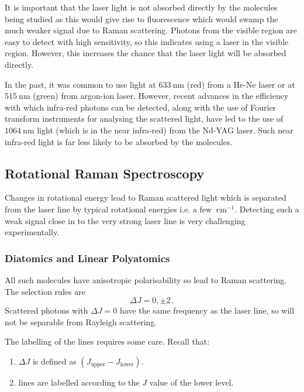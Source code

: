 \documentclass{article}
\theoremstyle{plain}\theoremheaderfont{\normalfont\itshape}\theorembodyfont{\rmfamily}\theoremseparator{.}\newtheorem*{rem}{Remark}\newtheorem*{ex}{Example}\newtheorem*{proof}{Proof}\newtheorem*{altp}{Alternative proof}
\theoremstyle{plain}\theoremheaderfont{\normalfont\bfseries}\theorembodyfont{\rmfamily}\theoremseparator{.}\newtheorem{thm}{Theorem}[section]\newtheorem{lem}[thm]{Lemma}\newtheorem{prop}[thm]{Proposition}\newtheorem*{cor}{Corollary}\newtheorem{defn}[thm]{Definition}\newtheorem{clm}[thm]{Claim}\newtheorem{clminproof}{Claim}\newtheorem{pos}{Postulate}[section]
\theoremstyle{break}\theoremheaderfont{\normalfont\itshape}\theorembodyfont{\rmfamily}\theoremseparator{.\medskip}\newtheorem*{proofskip}{Proof}\newtheorem*{exs}{Examples}\newtheorem*{rems}{Remarks}
\theoremstyle{break}\theoremheaderfont{\normalfont\bfseries}\theorembodyfont{\rmfamily}\theoremseparator{.\medskip}\newtheorem{lemskip}[thm]{Lemma}\newtheorem{defnskip}[thm]{Definition}\newtheorem{propskip}[thm]{Proposition}\newtheorem{thmskip}[thm]{Theorem}
\numberwithin{equation}{section}
\newcommand{\unit}[1]{\ \mathrm{#1}}
\begin{document}
    It is important that the laser light is not absorbed directly by the molecules being studied as this would give rise to fluorescence which would swamp the much weaker signal due to Raman scattering. Photons from the visible region are easy to detect with high sensitivity, so this indicates using a laser in the visible region. However, this increases the chance that the laser light will be absorbed directly.
    
    In the past, it was common to use light at \(633\unit{nm}\) (red) from a He-Ne laser or at \(515\unit{nm}\) (green) from argon-ion laser. However, recent advances in the efficiency with which infra-red photons can be detected, along with the use of Fourier transform instruments for analysing the scattered light, have led to the use of \(1064\unit{nm}\) light (which is in the near infra-red) from the Nd-YAG laser. Such near infra-red light is far less likely to be absorbed by the molecules.

    \subsection{Rotational Raman Spectroscopy}
    Changes in rotational energy lead to Raman scattered light which is separated from the laser line by typical rotational energies i.e. a few \(\!\unit{cm}^{-1}\). Detecting such a weak signal close in to the very strong laser line is very challenging experimentally.

    \subsubsection{Diatomics and Linear Polyatomics}
    All such molecules have anisotropic polarisability so lead to Raman scattering. The selection rules are
    \begin{equation}
        \Delta J=0,\pm 2\,.
    \end{equation}
    Scattered photons with \(\Delta J=0\) have the same frequency as the laser line, so will not be separable from Rayleigh scattering.

    The labelling of the lines requires some care. Recall that:
    \begin{enumerate}[topsep=0pt,label=(\roman*)]
        \item \(\Delta J\) is defined as \((J_{\text{upper}}-J_{\text{lower}})\).
        \item lines are labelled according to the \(J\) value of the lower level.
    \end{enumerate}
\end{document}
